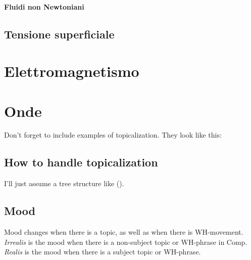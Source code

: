 \documentclass[12pt]{article}
\begin{document}
            \paragraph{Fluidi non Newtoniani}
    \subsection{Tensione superficiale}
\section{Elettromagnetismo}
\section{Onde}

Don't forget to include examples of topicalization.
They look like this:

{\small
{}
}

\subsection*{How to handle topicalization}

I'll just assume a tree structure like ().

{\small
{}
}

\subsection{Mood}

Mood changes when there is a topic, as well as when
there is WH-movement.  \emph{Irrealis} is the mood when
there is a non-subject topic or WH-phrase in Comp.
\emph{Realis} is the mood when there is a subject topic
or WH-phrase.
\end{document}
